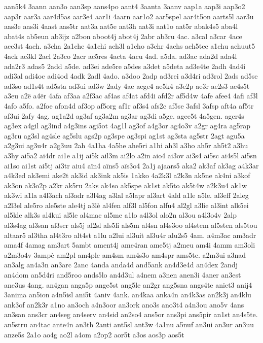 {aan5k4
3aann
aan3o
aan3sp
aans4po
aant4
3aanta
3aanv
aap1a
aap3i
aap3o2
aap3r
aar3a
aar4d5as
aar3e4
aar1i
4aarn
aar1o2
aar5spel
aar4t5on
aarts5l
aar3u
aas3e
aas3i
4aast
aas5tr
aat3a
aat5e
aat3h
aat3i
aat1o
aat5r
abak4s5
aba4l
abat4s
ab5eun
ab3ijz
a2bon
aboot4j
abot4j
2abr
ab3ru
4ac.
a3cal
a3car
4ace
ace3st
4ach.
a3cha
2a1che
4a1chi
ach3l
a1cho
a3chr
4achs
ach5tec
a1chu
achuut5
4ack
ac3kl
2acl
2a3co
2acr
ac5res
4acta
4acu
4ad.
a5da.
ad3ac
ada2d
ada4l
ada2r3
adas5
2add
a5de.
ad3ei
ade5re
a5des
a3det
a5deta
ad3e4te
2adh
4ad4i
adi3al
adi4oc
adi4od
4adk
2adl
4ado.
a3doo
2adp
ad3rei
a3d4ri
ad3rol
2ads
ad5se
ad3so
ad1s4t
ad5sta
ad3ui
ad3w
2ady
4ae
aege4
ae5k4
a3e2p
ae3r
ae2s3
ae4s5t
a3eu
a2ë
a4ër
4afa
af3aa
a2f3ac
af4as
af4at
afd4i
afd2r
af5d4w
4afe
afee4
4afi
af3l
4afo
a5fo.
a2foe
afon4d
af3op
af5org
af1r
af3s4
afs2c
af5se
3afsl
3afsp
aft4a
af5tr
af3ui
2afy
4ag.
ag1a2d
ag3af
ag3a2m
ag3ar
ag3di
a5ge.
agee5t
4a5gen.
ager4s
ag3ex
a4gil
ag3ind
a4g3ins
agi5ot
4ag1l
ag3of
a4g3or
ag4o3v
a2gr
ag4ra
ag5rap
ag3ru
ag3sl
ag4sle
ag5slu
ags2p
ag3spe
ag3spi
ag1st
ag3sta
ag5str
2agt
agu5a
a2g3ui
ag3u4r
a2g3uu
2ah
4a1ha
4a5he
ahe5ri
a1hi
ah3l
a3ho
ah5r
ah5t2
a3hu
a3hy
ai5a2
ai4dr
ai1e
a1ij
ai5k
ail3m
ai2lo
a2in
aio4
ai3ov
ai3s4
ai5sc
ai4s5l
ai5sn
ai1so
ai1st
ai5tj
ai3tr
aiu4
aïn4
aïns5
aïs3o4
2a1j
ajaars5
aka2
ak3af
ak3ag
a4k3ar
a4k3ed
ak3emi
ake2t
ak3id
ak3ink
ak5is
1akko
4a2k3l
a2k3n
ak5ne
ak4ni
a3kof
ak3on
ak3o2p
a2kr
ak5ru
2aks
ak4so
ak5spe
ak1st
ak5to
ak5t4w
a2k3u4
ak1w
ak3wi
a1la
a4l3ach
al3adr
a3l4ag
a3lal
a5lapr
al3art
4ald
a1le
a5le.
al3eff
2aleg
a2l3el
ale5ro
ale5ste
ale4tj
a3lè
al4fen
alf3l
al5fon
alfu4
al2gl
a3lie
al3int
alk5ei
al5kle
alk3s
al4kui
al5le
al4mac
al5me
a1lo
a4l3ol
alo2n
al3ou
a4l3o4v
2alp
al3s4ag
al3san
al3scr
als5j
al2sl
als5li
als5m
al4sn
al4s3oo
al4stem
al5sten
als5tou
altaar5
al3tha
al4t3ro
alt4st
a1lu
a2lui
al3uit
al3u4r
alu2s5
4am.
a4m3ac
am3adr
ama4f
4amag
am3art
5ambt
ament4j
ame4ran
ame5tj
a2meu
am4i
4amm
am3oli
a2m3o4v
3ampè
am2pl
am4ple
am4sm
am4s3o
am4spr
ams5te.
a2m3ui
a3nad
an3alg
an4a3n
an3arc
2anc
4anda
anda4d
and5ank
an4d3e4d
an4dex
2andj
an4dom
an5d4ri
and5roo
ands5lo
an4d3ul
a4nem
a3nen
anen3i
4aner
an3est
ane3us
4ang.
an4gan
anga5p
ange5st
ang5le
an2gr
ang5sna
angs4te
aniet3
anij4
3anima
an5ion
a4n5isl
ani5t
4aniv
4ank.
an4kaa
anka4n
an4k3as
an2k3j
an4klu
ank3of
an2k3r
a1no
an3och
a4n3oor
an3ork
ano3s
ano3t4
a4n3ou
ano5v
4ans
an3san
ans3cr
an4seg
an4serv
an4sid
an2so4
ans5or
ans3pi
ans5pir
an1st
an4s5te.
an5stru
an4tac
ante4n
an3th
2anti
ant5sl
ant3w
4a1nu
a5nuf
an3ui
an3ur
an3uu
anze5s
2a1o
ao4g
ao2l
a4om
a2op2
aor5t
a3os
aos3p
aos5t
}
